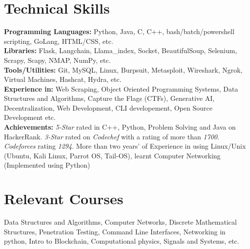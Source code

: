 \documentclass[letterpaper,11pt]{article}
\begin{document}
\section{Technical Skills}
 \begin{itemize}[leftmargin=0.15in, label={}]
    \small{\item{
     \textbf{Programming Languages: }{Python, Java, C, C++, bash/batch/powershell scripting, GoLang, HTML/CSS, etc.} \\
     \textbf{Libraries: }{Flask, Langchain, Llama\_index, Socket, BeautifulSoup, Selenium, Scrapy, Scapy, NMAP, NumPy, etc.} \\
     \textbf{Tools/Utilities: }{Git, MySQL, Linux, Burpsuit, Metasploit, Wireshark, Ngrok, Virtual Machines, Hashcat, Hydra, etc.} \\
     \textbf{Experience in: }{Web Scraping, Object Oriented Programming Systems, Data Structures and Algorithms, Capture the Flags (CTFs), Generative AI, Decentralization, Web Development, CLI developement, Open Source Development etc.} \\
     \textbf{Achievements: }{
    \textit{5-Star} rated in C++, Python, Problem Solving and Java on HackerRank.
    \textit{3-Star} rated on \textit{Codechef} with a rating of more than \textit{1700}. \textit{Codeforces} rating \textit{1294}. More than two years’ of Experience in using Linux/Unix (Ubuntu, Kali Linux, Parrot OS, Tail-OS), learnt Computer Networking (Implemented using Python)
     } \\
    }}
 \end{itemize}
 
 \section{Relevant Courses}
 \begin{itemize}[leftmargin=0.15in, label={}]
    \small{\item{
     Data Structures and Algorithms, Computer Networks, Discrete Mathematical Structures, Penetration Testing, Command Line Interfaces, Networking in python, Intro to Blockchain, Computational physics, Signals and Systems, etc.
    }}\\
 \end{itemize}
 


\end{document}
